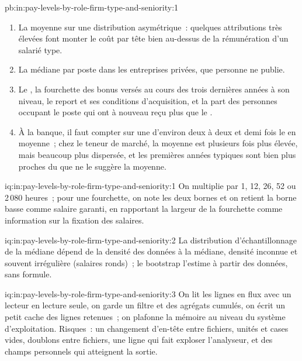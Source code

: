 \begin{solution}{pb:in:pay-levels-by-role-firm-type-and-seniority:1}
\begin{enumerate}
pour le salarié moyen, issues chacune d'une seule entité ou entreprise.
\item La moyenne sur une distribution asymétrique~: quelques attributions très élevées font monter le coût par tête bien au-dessus de la
rémunération d'un salarié type.
\item La  médiane par poste dans les entreprises privées, que personne ne publie.
\item Le , la fourchette des bonus versés au cours des trois dernières années à son niveau, le report et ses conditions d'acquisition, et la part des
personnes occupant le poste qui ont à nouveau reçu plus que le .
\item À la banque, il faut compter sur une  d'environ deux à deux et demi fois le  en moyenne~; chez le teneur de marché, la
moyenne est plusieurs fois plus élevée, mais beaucoup plus dispersée, et les premières années typiques sont bien plus proches du  que
ne le suggère la moyenne.
\end{enumerate}
\end{solution}

\begin{solution}{iq:in:pay-levels-by-role-firm-type-and-seniority:1}
On multiplie par 1, 12, 26, 52 ou 2\,080 heures~; pour une fourchette, on note les deux bornes et on retient la borne basse comme salaire garanti,
en rapportant la largeur de la fourchette comme information sur la fixation des salaires.
\end{solution}

\begin{solution}{iq:in:pay-levels-by-role-firm-type-and-seniority:2}
La distribution d'échantillonnage de la médiane dépend de la densité des données à la médiane, densité inconnue et souvent irrégulière (salaires
ronds)~; le bootstrap l'estime à partir des données, sans formule.
\end{solution}

\begin{solution}{iq:in:pay-levels-by-role-firm-type-and-seniority:3}
On lit les lignes en flux avec un lecteur en lecture seule, on garde un filtre et des agrégats cumulés, on écrit un petit cache des lignes retenues~; on plafonne la mémoire au
niveau du système d'exploitation. Risques~: un changement d'en-tête entre fichiers, unités et cases vides, doublons entre fichiers, une
ligne qui fait exploser l'analyseur, et des champs personnels qui atteignent la sortie.
\end{solution}

